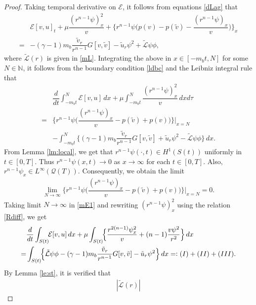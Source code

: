 \documentclass[a4paper,12pt,draft]{article}
\theoremstyle{remark}
\def\ut{\tilde{u}}
\def\vt{\tilde{v}}
\def\mE{\mathcal{E}}
\def\mL{\mathcal{L}}
\def\mQ{\mathcal{Q}}
\begin{document}
\begin{proof}
Taking temporal derivative on $\mE$, it follows from equations \eqref{dLag} that
\begin{align*}
    &\mE[v,u]_t + \mu \dfrac{(r^{n-1}\psi)_x^2}{v} + \Big\{ r^{n-1}\psi \Big( p(v) - p(\vt) - \dfrac{(r^{n-1}\psi)_x}{v} \Big) \Big\}_x\\
    =& -(\gamma-1) m_b \dfrac{\vt_r}{r^{n-1}} G[v,\vt] - \ut_r \psi^2 + \tilde{\mL} \psi \phi,
\end{align*}
where $\tilde{\mL}(r)$ is given in \eqref{mL}. Integrating the above in $x \in [-m_b t,N]$ for some $N\in \mathbb{N}$, it follows from the boundary condition \eqref{ldbc} and 
the 
Leibniz integral rule that
\begin{align}
    &\dfrac{d}{d t}\int_{-m_b t}^{N}\!\!\! \mE[v,u] \, dx + \mu\int_{-m_b t}^{N}\!\!\dfrac{(r^{n-1}\psi)_x^2}{v}\, dx d\tau \nonumber\\
    =& \!\Big\{ r^{n-1}\psi \Big( \dfrac{(r^{n-1}\psi)_x}{v} - p(\vt) +p(v) \Big)  \Big\}\Big\vert_{x=N} \nonumber\\
    &- \int_{-m_b t}^{N}\!\! \Big\{ (\gamma-1)m_b \dfrac{\vt_r}{r^{n-1}} G[v,\vt] + \ut_r \psi^2 -\tilde{\mL} \psi \phi \Big\} \, d x . \label{mE1}
\end{align}
From Lemma \ref{lm:local}, we get that $r^{n-1}\psi(\cdot,t) \in H^1(S(t))$ uniformly in $t\in[0,T]$. Thus $r^{n-1}\psi(x,t)\to 0$ as $x\to \infty$ for each $t\in[0,T]$. Also, $r^{n-1}\psi_{x} \in L^{\infty}(\mQ(T))$. Consequently, we obtain the limit
\begin{align*}
\lim\limits_{N\to\infty} \!\Big\{ r^{n-1}\psi \Big( \dfrac{(r^{n-1}\psi)_x}{v} - p(\vt) +p(v) \Big)  \Big\}\Big\vert_{x=N}= 0.
\end{align*}
Taking limit $N\to\infty$ in \eqref{mE1} and rewriting $(r^{n-1}\psi)_x^2$ using the relation \eqref{Rdiff}, we get
\begin{align}
    &\dfrac{d}{dt}\int_{S(t)}\!\! \mE[v,u] \, dx  + \mu\int_{S(t)}\!\!\Big\{ \dfrac{r^{2(n-1)}\psi_x^2}{v} + (n-1) \dfrac{v \psi^2}{r^2} \Big\}\, dx \nonumber\\
    =& \int_{S(t)}\!\! \Big\{ \tilde{\mL} \psi \phi -(\gamma-1)m_b \dfrac{\vt_r}{r^{n-1}} G[v,\vt] - \ut_r \psi^2 \Big\} \, d x =\vcentcolon \textrm{(I)}+\textrm{(II)}+\textrm{(III)}. \label{mE2}
\end{align}
By Lemma \ref{le:st}, it is verified that
\begin{align*}
    |\tilde{\mL}(r)| %

\end{align*}
\end{proof}
\end{document}
